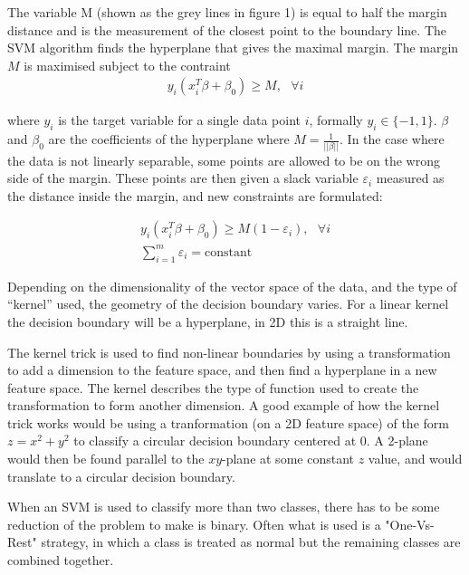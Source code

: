 \documentclass[a4paper,11pt,twoside]{article}
\begin{document}
The variable M (shown as the grey lines in figure 1) is equal to half the margin distance and is the measurement of the closest point to the boundary line. The SVM algorithm finds the hyperplane that gives the maximal margin. The margin $M$ is maximised subject to the contraint
\begin{equation}
\begin{gathered}
y_i(x_i^T \beta+\beta_0)\geq M,\text{ } \forall i
\end{gathered}
\end{equation}

where $y_i$ is the target variable for a single data point $i$, formally $y_i \in \{-1, 1\}$. $\beta$ and $\beta_0$ are the coefficients of the hyperplane where $M=\frac{1}{||\beta||}$. In the case where the data is not linearly separable, some points are allowed to be on the wrong side of the margin. These points are then given a slack variable $\varepsilon_i$ measured as the distance inside the margin, and new constraints are formulated:

\begin{equation}
\begin{gathered}
y_i(x_i^T \beta+\beta_0)\geq M(1-\varepsilon_i),\text{ } \forall i
\\
\sum_{i=1}^m\varepsilon_i = \text{constant}
\end{gathered}
\end{equation}

Depending on the dimensionality of the vector space of the data, and the type of “kernel” used, the geometry of the decision boundary varies. For a linear kernel the decision boundary will be a hyperplane, in 2D this is a straight line. 
\newline

The kernel trick is used to find non-linear boundaries by using a transformation to add a dimension to the feature space, and then find a hyperplane in a new feature space. The kernel describes the type of function used to create the transformation to form another dimension. A good example of how the kernel trick works would be using a tranformation (on a 2D feature space) of the form $z=x^2+y^2$ to classify a circular decision boundary centered at 0. A 2-plane would then be found parallel to the $xy$-plane at some constant $z$ value, and would translate to a circular decision boundary.
\newline

When an SVM is used to classify more than two classes, there has to be some reduction of the problem to make is binary. Often what is used is a "One-Vs-Rest" strategy, in which a class is treated as normal but the remaining classes are combined together.
\end{document}
